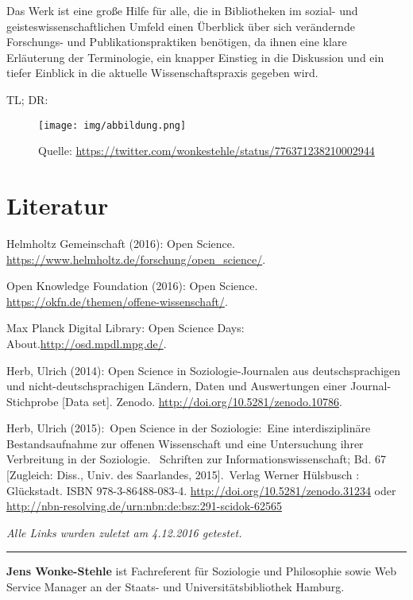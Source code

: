 \documentclass[a4paper,
fontsize=11pt,
oneside,
numbers=noperiodatend,
parskip=half-,
bibliography=totoc,
final
]{scrartcl}
\begin{document}
Das Werk ist eine große Hilfe für alle, die in Bibliotheken im sozial-
und geisteswissenschaftlichen Umfeld einen Überblick über sich
verändernde Forschungs- und Publikationspraktiken benötigen, da ihnen
eine klare Erläuterung der Terminologie, ein knapper Einstieg in die
Diskussion und ein tiefer Einblick in die aktuelle Wissenschaftspraxis
gegeben wird.

TL; DR:

\begin{figure}[H]
\centering
\texttt{[image: img/abbildung.png]}
\caption{Quelle:
\url{https://twitter.com/wonkestehle/status/776371238210002944}}
\end{figure}

\section*{Literatur}\label{literatur}

Helmholtz Gemeinschaft (2016): Open Science.
\url{https://www.helmholtz.de/forschung/open_science/}.

Open Knowledge Foundation (2016): Open Science.
\url{https://okfn.de/themen/offene-wissenschaft/}.

Max Planck Digital Library: Open Science Days:
About.\url{http://osd.mpdl.mpg.de/}.

Herb, Ulrich (2014): Open Science in Soziologie-Journalen aus
deutschsprachigen und nicht-deutschsprachigen Ländern, Daten und
Auswertungen einer Journal-Stichprobe {[}Data set{]}. Zenodo.
\url{http://doi.org/10.5281/zenodo.10786}.

Herb, Ulrich (2015):~Open Science in der Soziologie:~Eine
interdisziplinäre Bestandsaufnahme zur offenen Wissenschaft und eine
Untersuchung ihrer Verbreitung in der Soziologie. ~Schriften zur
Informationswissenschaft; Bd. 67 {[}Zugleich: Diss., Univ. des
Saarlandes, 2015{]}.~Verlag Werner Hülsbusch : Glückstadt. ISBN
978-3-86488-083-4. \url{http://doi.org/10.5281/zenodo.31234} oder
\url{http://nbn-resolving.de/urn:nbn:de:bsz:291-scidok-62565}

\emph{Alle Links wurden zuletzt am 4.12.2016 getestet.}

\begin{center}\rule{0.5\linewidth}{\linethickness}\end{center}

\textbf{Jens Wonke-Stehle} ist Fachreferent für Soziologie und
Philosophie sowie Web Service Manager an der Staats- und
Universitätsbibliothek Hamburg.
\end{document}
